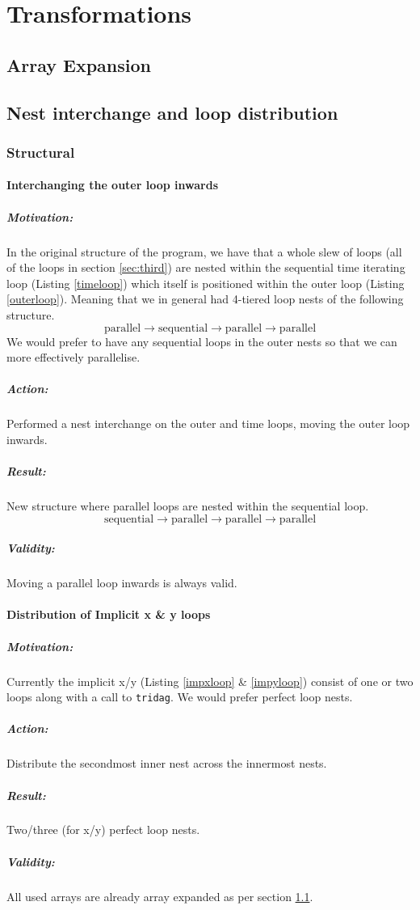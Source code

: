 \section{Transformations}

\subsection{Array Expansion}
\label{sec:arrayexp}

\subsection{Nest interchange and loop distribution}

\subsubsection{Structural}
\paragraph{Interchanging the outer loop inwards}
\subparagraph{Motivation:} In the original structure of the program, we have that a whole slew of loops
 (all of the loops in section \ref{sec:third}) are nested
 within the sequential time iterating loop (Listing \ref{timeloop}) which itself is positioned within
 the outer loop (Listing \ref{outerloop}). Meaning that we in general had 4-tiered loop nests of the following
 structure.
$$\mathrm{parallel} \to \mathrm{sequential} \to \mathrm{parallel} \to \mathrm{parallel}$$
We would prefer to have any sequential loops in the outer nests so that we can more effectively
 parallelise.
\subparagraph{Action:} Performed a nest interchange on the outer and time loops, moving the outer loop inwards.
\subparagraph{Result:} New structure where parallel loops are nested within the sequential loop.
$$\mathrm{sequential} \to \mathrm{parallel} \to \mathrm{parallel} \to \mathrm{parallel}$$
\subparagraph{Validity:} Moving a parallel loop inwards is always valid.

\paragraph{Distribution of Implicit x \& y loops}
\subparagraph{Motivation:} Currently the implicit x/y (Listing \ref{impxloop} \& \ref{impyloop}) consist of one or two loops along with a call
 to \verb!tridag!. We would prefer perfect loop nests.
\subparagraph{Action:} Distribute the secondmost inner nest across the innermost nests.
\subparagraph{Result:} Two/three (for x/y) perfect loop nests.
\subparagraph{Validity:} All used arrays are already array expanded as per section \ref{sec:arrayexp}.

